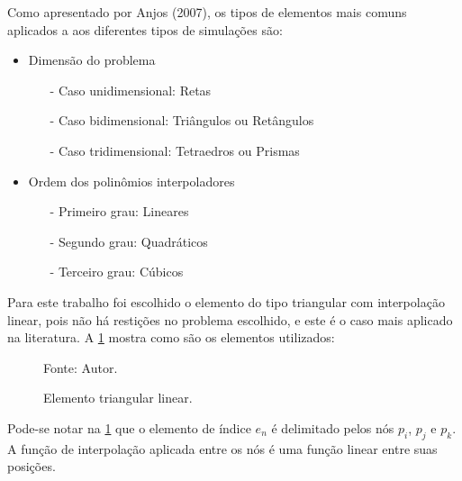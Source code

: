 Como apresentado por Anjos (2007)\cite{gustavo}, os tipos de elementos mais comuns aplicados a aos diferentes tipos de simulações são:
\begin{itemize}
    \item Dimensão do problema
    \begin{itemize}
        \item[-] Caso unidimensional: Retas
        \item[-] Caso bidimensional: Triângulos ou Retângulos
        \item[-] Caso tridimensional: Tetraedros ou Prismas
    \end{itemize}
    \item Ordem dos polinômios interpoladores
    \begin{itemize}
        \item[-] Primeiro grau: Lineares 
        \item[-] Segundo grau: Quadráticos
        \item[-] Terceiro grau: Cúbicos
    \end{itemize}
\end{itemize}

Para este trabalho foi escolhido o elemento do tipo triangular com interpolação linear, pois não há restições no problema escolhido, e este é o caso mais aplicado na literatura.
A \ref{element} mostra como são os elementos utilizados:
\begin{figure}[H]
    \centering
     {\raggedleft \scriptsize Fonte: Autor.}
    \caption{Elemento triangular linear.}
    \label{element}
\end{figure}

Pode-se notar na \ref{element} que o elemento de índice $e_n$ é delimitado pelos nós $p_i$, $p_j$ e $p_k$.
A função de interpolação aplicada entre os nós é uma função linear entre suas posições.

